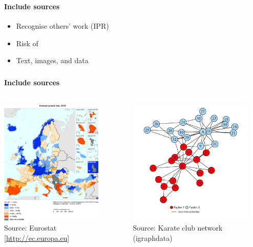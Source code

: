 \documentclass[8pt]{beamer}
\begin{document}

\begin{frame}
\frametitle{\insertsection}
\framesubtitle{Include sources}

\begin{itemize}
\item Recognise others' work (IPR)
\item Risk of {\color{red}{plagiarism}}
\item Text, images, and data
\end{itemize}


\end{frame}


\begin{frame}
\frametitle{\insertsection}
\framesubtitle{Include sources}

\begin{columns}

\centering
\includegraphics[height=6cm]{unemp}\\
\tiny{Source: Eurostat [\url{http://ec.europa.eu}]}

\centering
\includegraphics[height=6cm]{karate_l}\\
\tiny{Source: Karate club network (igraphdata) \cite{Zachary1977}}

\end{columns}

\end{frame}
\end{document}
